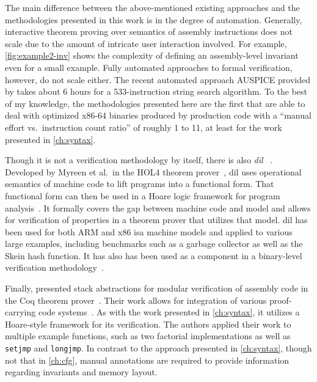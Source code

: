 The main difference between the above-mentioned existing approaches
and the methodologies presented in this work is in the degree of automation.
Generally, interactive theorem proving over semantics of assembly instructions
does not scale due to the amount of intricate user interaction involved.
For example, \cref{fig:example2-inv} shows
the complexity of defining an assembly-level invariant even for a small example.
Fully automated approaches to formal verification, however, do not scale either.
The recent automated approach AUSPICE provided by \citet{tan2015auspice}
takes about 6 hours for a 533-instruction string search algorithm.
To the best of my knowledge,
the methodologies presented here are the first that are able to deal with
optimized x86-64 binaries produced by production code
with a ``manual effort vs.\ instruction count ratio'' of roughly 1 to 11,
at least for the work presented in \cref{ch:syntax}.

Though it is not a verification methodology by itself,
there is also \emph{\ac{dil}}~%
\citep{myreen2008decompilation,myreen2012decompilation}.
Developed by Myreen et al.\ in the HOL4 theorem prover~\citep{slind2008brief},
\ac{dil} uses operational semantics of machine code
to lift programs into a functional form.
That functional form can then be used in a Hoare logic framework
for program analysis~\citep{myreen2007hoare}.
It formally covers the gap between machine code and  model
and allows for verification of properties in a theorem prover that utilizes that model.
\Ac{dil} has been used for both ARM and x86 \ac{isa} machine models
and applied to various large examples,
including benchmarks such as a garbage collector as well as the Skein hash function.
It has also has been used as a component in a binary-level verification methodology~\citep{sewell2013tvv}.

Finally, \citet{feng2006modular,feng2005sbca} presented stack abstractions
for modular verification of assembly code
in the Coq theorem prover~\citep{chlipala2013certified}.
Their work allows for integration
of various proof-carrying code systems~\citep{necula1997proof}.
As with the work presented in \cref{ch:syntax},
it utilizes a Hoare-style framework for its verification.
The authors applied their work to multiple example functions,
such as two factorial implementations
as well as \lstinline[style=C]|setjmp| and \lstinline[style=C]|longjmp|.
In contrast to the approach presented in \cref{ch:syntax},
though not that in \cref{ch:cfg},
manual annotations are required to provide information
regarding invariants and memory layout.

